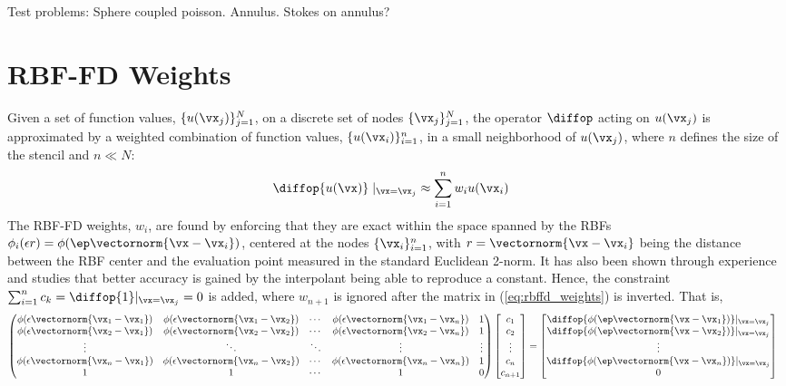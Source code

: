 Test problems: Sphere coupled poisson. Annulus. Stokes on annulus? 



\section{RBF-FD Weights} 

Given a set of function values, $\{u(\vx_j)\}_{j=1}^{N}$, on a discrete set of nodes $\{\vx_j\}_{j=1}^{N}$, the operator $\diffop$ acting on $u(\vx_j)$ is approximated by a weighted combination of function values, $\{u(\vx_i)\}_{i=1}^{n}$, in a small neighborhood of $u(\vx_j)$, where $n$ defines the size of the stencil and $n \ll N$:
\begin{align}
\diffop{u(\vx)}\mid_{\vx=\vx_j} &\approx \sum_{i=1}^{n} w_i u(\vx_i)
\label{eq:derivFromFDWeights}
\end{align}
The RBF-FD weights, ${w_i}$, are found by enforcing that they are exact within the space spanned by the RBFs $\phi_i(\epsilon r) = \phi(\ep\vectornorm{\vx-\vx_{i}})$, centered at the nodes $\{\vx_i\}_{i=1}^{n}$, with $r=\vectornorm{\vx -\vx_i}$ being the distance between the RBF center and the evaluation point measured in the standard Euclidean 2-norm. It has also been shown through experience and studies \cite{WrightFornberg06,FornbergDriscoll02,FornbergLehto11,FlyerLehto11} that better accuracy is gained by the interpolant being able to reproduce a constant. Hence, the constraint $\sum_{i=1}^{n}c_k=\diffop{1}|_{\vx=\vx_{j}}=0$ is added, where $w_{n+1}$ is ignored after the matrix in (\ref{eq:rbffd_weights}) is inverted. That is,
\begin{align}
\begin{pmatrix}
\phi(\epsilon\vectornorm{\vx_1-\vx_1}) & \phi(\epsilon\vectornorm{\vx_1-\vx_2}) & \cdots & \phi(\epsilon\vectornorm{\vx_1-\vx_n}) & 1 \\
\phi(\epsilon\vectornorm{\vx_2-\vx_1}) & \phi(\epsilon\vectornorm{\vx_2-\vx_2}) & \cdots &
\phi(\epsilon\vectornorm{\vx_2-\vx_n}) & 1\\
\vdots & \ddots & \ddots & \vdots & \vdots\\
\phi(\epsilon\vectornorm{\vx_n-\vx_1}) & \phi(\epsilon\vectornorm{\vx_n-\vx_2}) & \cdots &
\phi(\epsilon\vectornorm{\vx_n-\vx_n}) & 1 \\
1 & 1 & \cdots & 1 & 0
\end{pmatrix}
\begin{bmatrix} c_1 \\ c_2 \\ \vdots \\ c_n  \\ c_{n+1}\end{bmatrix}
&=
\begin{bmatrix} \diffop{\phi(\ep\vectornorm{\vx-\vx_{1}})}|_{\vx=\vx_{j}} \\
               \diffop{\phi(\ep\vectornorm{\vx-\vx_{2}})}|_{\vx=\vx_{j}} \\ \vdots \\  \diffop{\phi(\ep\vectornorm{\vx-\vx_{n}})}|_{\vx=\vx_{j}}\\
		       0
\end{bmatrix}
\label{eq:rbffd_weights}
\end{align}	
